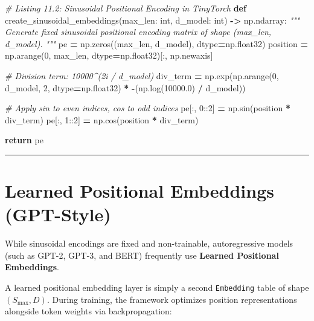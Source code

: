 \documentclass[
  letterpaper,
]{scrbook}
\newenvironment{Shaded}{\begin{snugshade}}{\end{snugshade}}
\newcommand{\BuiltInTok}[1]{#1}
\newcommand{\CommentTok}[1]{\textcolor[rgb]{0.56,0.35,0.01}{\textit{#1}}}
\newcommand{\ControlFlowTok}[1]{\textcolor[rgb]{0.13,0.29,0.53}{\textbf{#1}}}
\newcommand{\DecValTok}[1]{\textcolor[rgb]{0.00,0.00,0.81}{#1}}
\newcommand{\FloatTok}[1]{\textcolor[rgb]{0.00,0.00,0.81}{#1}}
\newcommand{\KeywordTok}[1]{\textcolor[rgb]{0.13,0.29,0.53}{\textbf{#1}}}
\newcommand{\NormalTok}[1]{#1}
\newcommand{\OperatorTok}[1]{\textcolor[rgb]{0.81,0.36,0.00}{\textbf{#1}}}
\begin{document}
\begin{Shaded}
\begin{Highlighting}[]
\CommentTok{\# Listing 11.2: Sinusoidal Positional Encoding in TinyTorch}
\KeywordTok{def}\NormalTok{ create\_sinusoidal\_embeddings(max\_len: }\BuiltInTok{int}\NormalTok{, d\_model: }\BuiltInTok{int}\NormalTok{) }\OperatorTok{{-}\textgreater{}}\NormalTok{ np.ndarray:}
    \CommentTok{"""}
\CommentTok{    Generate fixed sinusoidal positional encoding matrix of shape (max\_len, d\_model).}
\CommentTok{    """}
\NormalTok{    pe }\OperatorTok{=}\NormalTok{ np.zeros((max\_len, d\_model), dtype}\OperatorTok{=}\NormalTok{np.float32)}
\NormalTok{    position }\OperatorTok{=}\NormalTok{ np.arange(}\DecValTok{0}\NormalTok{, max\_len, dtype}\OperatorTok{=}\NormalTok{np.float32)[:, np.newaxis]}

    \CommentTok{\# Division term: 10000\^{}(2i / d\_model)}
\NormalTok{    div\_term }\OperatorTok{=}\NormalTok{ np.exp(np.arange(}\DecValTok{0}\NormalTok{, d\_model, }\DecValTok{2}\NormalTok{, dtype}\OperatorTok{=}\NormalTok{np.float32) }\OperatorTok{*} \OperatorTok{{-}}\NormalTok{(np.log(}\FloatTok{10000.0}\NormalTok{) }\OperatorTok{/}\NormalTok{ d\_model))}

    \CommentTok{\# Apply sin to even indices, cos to odd indices}
\NormalTok{    pe[:, }\DecValTok{0}\NormalTok{::}\DecValTok{2}\NormalTok{] }\OperatorTok{=}\NormalTok{ np.sin(position }\OperatorTok{*}\NormalTok{ div\_term)}
\NormalTok{    pe[:, }\DecValTok{1}\NormalTok{::}\DecValTok{2}\NormalTok{] }\OperatorTok{=}\NormalTok{ np.cos(position }\OperatorTok{*}\NormalTok{ div\_term)}

    \ControlFlowTok{return}\NormalTok{ pe}
\end{Highlighting}
\end{Shaded}

\begin{center}\rule{0.5\linewidth}{0.5pt}\end{center}

\section{Learned Positional Embeddings
(GPT-Style)}\label{learned-positional-embeddings-gpt-style}

While sinusoidal encodings are fixed and non-trainable, autoregressive
models (such as GPT-2, GPT-3, and BERT) frequently use \textbf{Learned
Positional Embeddings}.

A learned positional embedding layer is simply a second
\texttt{Embedding} table of shape \((S_{\text{max}}, D)\). During
training, the framework optimizes position representations alongside
token weights via backpropagation:
\end{document}
